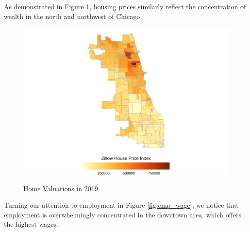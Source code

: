 \documentclass[12pt]{article}
\begin{document}
As demonstrated in Figure \ref{fig:housing_diag}, housing prices similarly reflect the concentration of wealth in the north and northwest of Chicago
\begin{figure}[h!]
    \centering
    \caption{Home Valuations in 2019}
    \includegraphics[width=\linewidth]{Pset1/code/lodes_diagnostics_files/figure-html/fig-houseprices-1.png}
    \label{fig:housing_diag}
\end{figure}
Turning our attention to employment in Figure \ref{fig:emp_wage}, we notice that employment is overwhelmingly concentrated in the downtown area, which offers the highest wages. 
\end{document}
